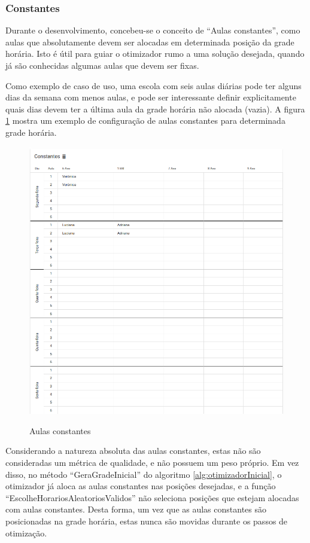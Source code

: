 \subsubsection{Constantes}

Durante o desenvolvimento, concebeu-se o conceito de ``Aulas constantes'', como aulas que absolutamente devem ser alocadas em determinada posição da grade horária. Isto é útil para guiar o otimizador rumo a uma solução desejada, quando já são conhecidas algumas aulas que devem ser fixas. 

Como exemplo de caso de uso, uma escola com seis aulas diárias pode ter alguns dias da semana com menos aulas, e pode ser interessante definir explicitamente quais dias devem ter a última aula da grade horária não alocada (vazia). A figura \ref{fig:constantes} mostra um exemplo de configuração de aulas constantes para determinada grade horária.

\begin{figure}[!htb]
	\centering
	\caption{Aulas constantes}
	\includegraphics[width=1\textwidth]{./dados/figuras/constantes}
	\label{fig:constantes}
\end{figure}
\pagebreak

Considerando a natureza absoluta das aulas constantes, estas não são consideradas um métrica de qualidade, e não possuem um peso próprio. Em vez disso, no método ``GeraGradeInicial'' do algoritmo \ref{alg:otimizadorInicial}, o otimizador já aloca as aulas constantes nas posições desejadas, e a função ``EscolheHorariosAleatoriosValidos'' não seleciona posições que estejam alocadas com aulas constantes. Desta forma, um vez que as aulas constantes são posicionadas na grade horária, estas nunca são movidas durante os passos de otimização.

